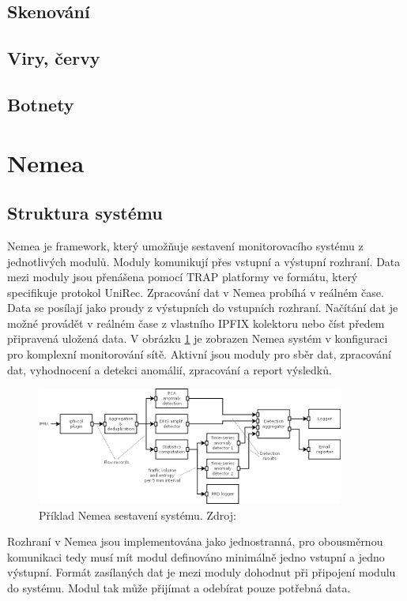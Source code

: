\documentclass[thesis=M,czech]{FITthesis}[2012/06/26]
\begin{document}
\subsection{Skenování}
\label{sken}
\subsection{Viry, červy}
\label{virus}
\subsection{Botnety}
\label{botnet}

\section{Nemea}
\subsection{Struktura systému}
Nemea je framework, který umožňuje sestavení monitorovacího systému z jednotlivých modulů. Moduly komunikují přes vstupní a výstupní rozhraní. Data mezi moduly jsou přenášena pomocí TRAP platformy ve formátu, který specifikuje protokol UniRec. Zpracování dat v Nemea probíhá v reálném čase. Data se posílají jako proudy z výstupních do vstupních rozhraní. Načítání dat je možné provádět v reálném čase z vlastního IPFIX kolektoru nebo číst předem připravená uložená data. V obrázku \ref{img:nemea_example} je zobrazen Nemea systém v konfiguraci pro komplexní monitorování sítě. Aktivní jsou moduly pro sběr dat, zpracování dat, vyhodnocení a detekci anomálií, zpracování a report výsledků.
\begin{figure}[!htbp]\centering
	\includegraphics[width=0.9\textwidth]{nemea.png}
	\caption[Příklad Nemea sestavení systému. Zdroj: \cite{nemea}]{Příklad Nemea sestavení systému. Zdroj: \cite{nemea}}
	\label{img:nemea_example}
\end{figure} 
Rozhraní v Nemea jsou implementována jako jednostranná, pro obousměrnou komunikaci tedy musí mít modul definováno minimálně jedno vstupní a jedno výstupní. Formát zasílaných dat je mezi moduly dohodnut při připojení modulu do systému. Modul tak může přijímat a odebírat pouze potřebná data.
\end{document}
